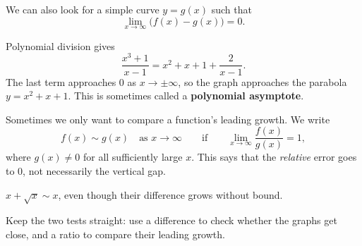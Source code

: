 We can also look for a simple curve $y=g(x)$ such that
$$\lim_{x\to\infty}\bigl(f(x)-g(x)\bigr)=0.$$
\begin{exampleblock}
Polynomial division gives
$$\frac{x^3+1}{x-1}=x^2+x+1+\frac{2}{x-1}.$$
The last term approaches 0 as $x\to\pm\infty$, so the graph approaches
the parabola $y=x^2+x+1$. This is sometimes called a
\textbf{polynomial asymptote}.
\end{exampleblock}

Sometimes we only want to compare a function's leading growth. We write
$$f(x)\sim g(x)\quad\text{as }x\to\infty
\qquad\text{if}\qquad
\lim_{x\to\infty}\frac{f(x)}{g(x)}=1,$$
where $g(x)\ne0$ for all sufficiently large $x$. This says that the
\textit{relative} error goes to 0, not necessarily the vertical gap.
\begin{exampleblock}
$x+\sqrt{x}\sim x$, even though their difference grows without bound.
\end{exampleblock}
Keep the two tests straight: use a difference to check
whether the graphs get close, and a ratio to compare their leading growth.
